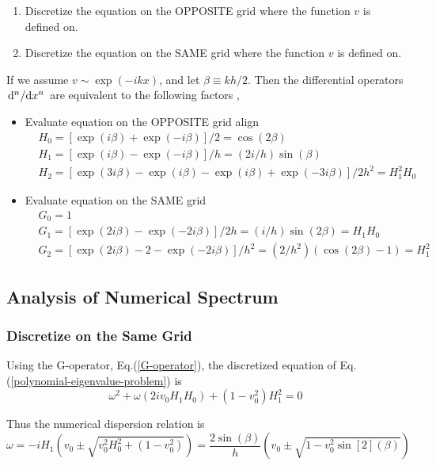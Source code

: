 \begin{enumerate}
	\item Discretize the equation on the OPPOSITE grid where the function $v$ is defined on.
	\item Discretize the equation on the SAME grid where the function $v$ is defined on.
\end{enumerate}


If we assume $v\sim \exp(-ikx)$, and let $\beta\equiv kh/2$. Then the differential operators $\dv*[n]{x}$ are equivalent to the following factors \cite{llobet_spectral_1990},
\begin{itemize}
	\item Evaluate equation on the OPPOSITE grid
	align
	\begin{align}
		&H_0 = [\exp(i\beta)+\exp(-i\beta)]/2 = \cos(2\beta) \nonumber \\
		&H_1 = [\exp(i\beta)-\exp(-i\beta)]/h = (2i/h)\sin(\beta) 
		\label{H-operator} \\
		&H_2 = [\exp(3i\beta)-\exp(i\beta)-\exp(i\beta)+\exp(-3i\beta)]/2h^2 = H_1^2H_0 \nonumber 
	\end{align}
	
	\item Evaluate equation on the SAME grid
	\begin{align}
		&G_0 = 1 \nonumber \\
		&G_1 = [\exp(2i\beta)-\exp(-2i\beta)]/2h = (i/h)\sin(2\beta) = H_1H_0 
		\label{G-operator}\\
		&G_2 = [\exp(2i\beta)-2-\exp(-2i\beta)]/h^2 = (2/h^2)(\cos(2\beta)-1) = H_1^2 \nonumber 
	\end{align}
\end{itemize}


\subsection{Analysis of Numerical Spectrum}
\subsubsection{Discretize on the Same Grid}
Using the G-operator, Eq.(\ref{G-operator}), the discretized equation of Eq.(\ref{polynomial-eigenvalue-problem}) is 
\[ \omega^2 + \omega(2iv_0H_1H_0) + (1-v_0^2)H_1^2 = 0 \]

Thus the numerical dispersion relation is
\begin{equation} \label{dispersion-relation-G}
	\omega = -iH_1 \left(v_0 \pm \sqrt{v_0^2H_0^2 + (1-v_0^2)}\right) = \frac{2\sin(\beta)}{h}\left(v_0 \pm \sqrt{1 - v_0^2\sin[2](\beta)}\right)
\end{equation}

